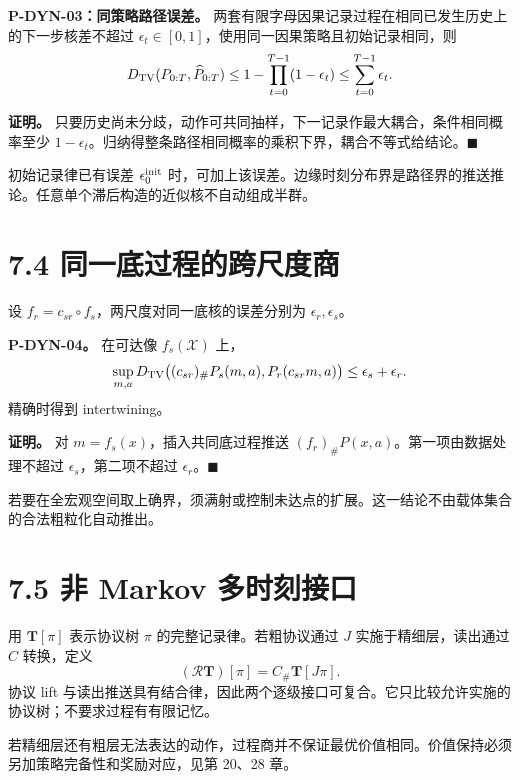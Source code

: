 \documentclass[
  11pt,
  oneside]{book}
\begin{document}
\hypertarget{p-dyn-03}{}\label{p-dyn-03}

\textbf{P-DYN-03：同策略路径误差。} 两套有限字母因果记录过程在相同已发生历史上的下一步核差不超过 \(\epsilon_t\in[0,1]\)，使用同一因果策略且初始记录相同，则 \[D_{\rm TV}(P_{0:T},\widehat P_{0:T})
\le1-\prod_{t=0}^{T-1}(1-\epsilon_t)
\le\sum_{t=0}^{T-1}\epsilon_t.\]

\textbf{证明。} 只要历史尚未分歧，动作可共同抽样，下一记录作最大耦合，条件相同概率至少 \(1-\epsilon_t\)。归纳得整条路径相同概率的乘积下界，耦合不等式给结论。\(\blacksquare\)

初始记录律已有误差 \(\epsilon_0^{\rm init}\) 时，可加上该误差。边缘时刻分布界是路径界的推送推论。任意单个滞后构造的近似核不自动组成半群。

\section{7.4 同一底过程的跨尺度商}\label{ux540cux4e00ux5e95ux8fc7ux7a0bux7684ux8de8ux5c3aux5ea6ux5546}

设 \(f_r=c_{sr}\circ f_s\)，两尺度对同一底核的误差分别为 \(\epsilon_r,\epsilon_s\)。

\hypertarget{p-dyn-04}{}\label{p-dyn-04}

\textbf{P-DYN-04。} 在可达像 \(f_s(\mathcal X)\) 上， \[\sup_{m,a}D_{\rm TV}
\bigl((c_{sr})_\#P_s(m,a),P_r(c_{sr}m,a)\bigr)
\le\epsilon_s+\epsilon_r.\] 精确时得到 intertwining。

\textbf{证明。} 对 \(m=f_s(x)\)，插入共同底过程推送 \((f_r)_\#P(x,a)\)。第一项由数据处理不超过 \(\epsilon_s\)，第二项不超过 \(\epsilon_r\)。\(\blacksquare\)

若要在全宏观空间取上确界，须满射或控制未达点的扩展。这一结论不由载体集合的合法粗粒化自动推出。

\section{7.5 非 Markov 多时刻接口}\label{ux975e-markov-ux591aux65f6ux523bux63a5ux53e3}

用 \(\mathbf T[\pi]\) 表示协议树 \(\pi\) 的完整记录律。若粗协议通过 \(J\) 实施于精细层，读出通过 \(C\) 转换，定义 \[(\mathcal R\mathbf T)[\pi]=C_\#\mathbf T[J\pi].\] 协议 lift 与读出推送具有结合律，因此两个逐级接口可复合。它只比较允许实施的协议树；不要求过程有有限记忆。

若精细层还有粗层无法表达的动作，过程商并不保证最优价值相同。价值保持必须另加策略完备性和奖励对应，见第 20、28 章。
\end{document}

